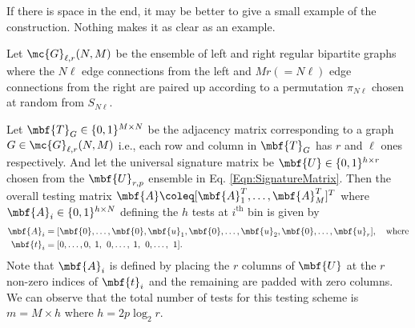 \documentclass[conference,twocolumn]{IEEEtran}
\newcommand*{\FigPath}{../Figures}
\begin{document}
{\textcolor[rgb]{1.00,0.00,0.00}{If there is space in the end, it may be better to give a small example of the construction. Nothing makes it as clear as an example.}

\begin{definition}
Let $\mc{G}_{\ell,r}(N,M)$ be the ensemble of left and right regular bipartite graphs where the $N\ell$ edge connections from the left and $Mr(=N\ell)$ edge connections from the right are paired up according to a permutation $\pi_{N\ell}$ chosen at random from $S_{N\ell}$.
\end{definition}

 Let $\mbf{T}_{G}\in\{0,1\}^{M\times N }$ be the adjacency matrix corresponding to a graph $G\in\mc{G}_{\ell,r}(N,M)$ i.e., each row and column in $\mbf{T}_{G}$ has $r$ and $\ell$ ones respectively. And let the universal signature matrix be $\mbf{U}\in\{0,1\}^{h \times r}$ chosen from the $\mbf{U}_{r,p}$ ensemble in Eq. \eqref{Eqn:SignatureMatrix}. Then the overall testing matrix $\mbf{A}\coleq [\mbf{A}_{1}^{T},\ldots,\mbf{A}_{M}^{T}]^T$ where $\mbf{A}_{i}\in\{0,1\}^{h\times N}$ defining the $h$ tests at $i^{\text{th}}$ bin is given by
 \begin{align}
 \mbf{A}_i&=[\mbf{0},\ldots,\mbf{0},\mbf{u}_1, \mbf{0},\ldots, \mbf{u}_2,\mbf{0}, \ldots, \mbf{u}_{r}],\quad \text{where}\label{Eqn:TestingMatrixDefn}\\
\mbf{t}_i &= [0,\ldots,0,\hspace{0.6ex}1,\hspace{0.9ex} 0, \ldots,\hspace{0.6ex}1,\hspace{0.9ex}0, \ldots, \hspace{0.9ex}1].\nonumber
 \end{align}
Note that $\mbf{A}_i$ is defined by placing the $r$ columns of $\mbf{U}$ at the $r$ non-zero indices of $\mbf{t}_i$ and the remaining are padded with zero columns. We can observe that the total number of tests for this testing scheme is $m=M\times h$ where $h=2p\log_2 r$.


}
\end{document}
